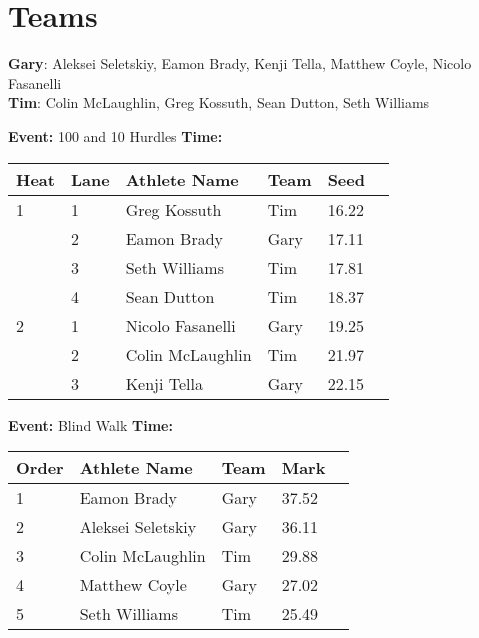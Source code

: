 \documentclass[10pt]{article}
\begin{document}
\vspace{2em}
\section*{Teams}

\textbf{Gary}: Aleksei Seletskiy, Eamon Brady, Kenji Tella, Matthew Coyle, Nicolo Fasanelli
\\\textbf{Tim}: Colin McLaughlin, Greg Kossuth, Sean Dutton, Seth Williams

\twocolumn


\textbf{Event:} 100 and 10 Hurdles \quad \textbf{Time:}  

\vspace{1em}
\begin{tabular}{@{}llllll@{}}
\toprule
\textbf{{Heat}} &
\textbf{Lane} & \textbf{Athlete Name} & \textbf{Team} & \textbf{Seed} \\
\midrule
1 & 1 & Greg Kossuth & Tim & 16.22 &\\
 & 2 & Eamon Brady & Gary & 17.11 &\\
 & 3 & Seth Williams & Tim & 17.81 &\\
 & 4 & Sean Dutton & Tim & 18.37 &\\
2 & 1 & Nicolo Fasanelli & Gary & 19.25 &\\
 & 2 & Colin McLaughlin & Tim & 21.97 &\\
 & 3 & Kenji Tella & Gary & 22.15 &\\
\bottomrule
\end{tabular}
\vspace{2.5em}


\textbf{Event:} Blind Walk \quad \textbf{Time:}  

\vspace{1em}
\begin{tabular}{@{}lllll@{}}
\toprule

\textbf{Order} & \textbf{Athlete Name} & \textbf{Team} & \textbf{Mark} \\
\midrule
1 & Eamon Brady & Gary & 37.52 &\\
2 & Aleksei Seletskiy & Gary & 36.11 &\\
3 & Colin McLaughlin & Tim & 29.88 &\\
4 & Matthew Coyle & Gary & 27.02 &\\
5 & Seth Williams & Tim & 25.49 &\\
\bottomrule
\end{tabular}
\vspace{2.5em}
\end{document}
